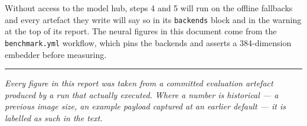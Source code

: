 \documentclass[11pt,a4paper]{article}
\newcommand{\code}[1]{\texttt{\small #1}}
\begin{document}
Without access to the model hub, steps 4 and 5 will run on the offline fallbacks
and every artefact they write will say so in its \code{backends} block and in the
warning at the top of its report. The neural figures in this document come from
the \code{benchmark.yml} workflow, which pins the backends and asserts a
384-dimension embedder before measuring.

\vspace{1.2em}
\noindent\rule{\textwidth}{0.4pt}
\vspace{0.4em}

\noindent\small\textit{Every figure in this report was taken from a committed
evaluation artefact produced by a run that actually executed. Where a number is
historical --- a previous image size, an example payload captured at an earlier
default --- it is labelled as such in the text.}
\end{document}
